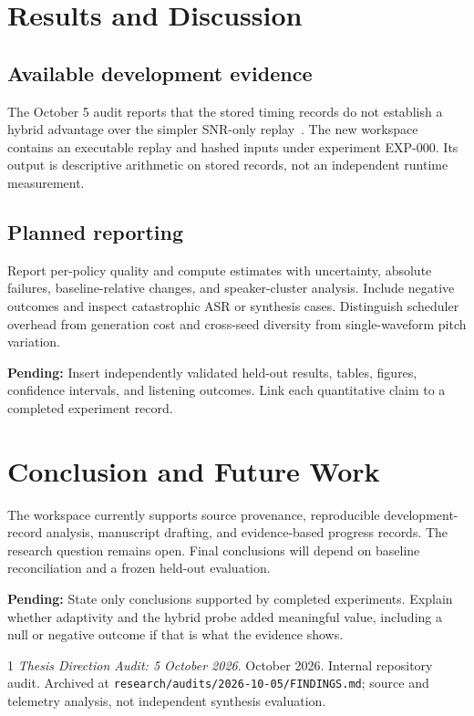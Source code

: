 \documentclass[12pt,a4paper,oneside]{report}
\newcommand{\pending}[1]{\par\noindent\textbf{Pending:} #1\par}
\begin{document}
\chapter{Results and Discussion}
\label{ch:results}
\section{Available development evidence}
The October 5 audit reports that the stored timing records do not establish a hybrid advantage over the simpler SNR-only replay~\cite{internal-audit-2026}. The new workspace contains an executable replay and hashed inputs under experiment EXP-000. Its output is descriptive arithmetic on stored records, not an independent runtime measurement.

\section{Planned reporting}
Report per-policy quality and compute estimates with uncertainty, absolute failures, baseline-relative changes, and speaker-cluster analysis. Include negative outcomes and inspect catastrophic ASR or synthesis cases. Distinguish scheduler overhead from generation cost and cross-seed diversity from single-waveform pitch variation.
\pending{Insert independently validated held-out results, tables, figures, confidence intervals, and listening outcomes. Link each quantitative claim to a completed experiment record.}
\chapter{Conclusion and Future Work}
The workspace currently supports source provenance, reproducible development-record analysis, manuscript drafting, and evidence-based progress records. The research question remains open. Final conclusions will depend on baseline reconciliation and a frozen held-out evaluation.
\pending{State only conclusions supported by completed experiments. Explain whether adaptivity and the hybrid probe added meaningful value, including a null or negative outcome if that is what the evidence shows.}
\begin{thebibliography}{1}
\emph{Thesis Direction Audit: 5 October 2026}. October 2026.
Internal repository audit. Archived at
\texttt{research/audits/2026-10-05/FINDINGS.md}; source and telemetry analysis,
not independent synthesis evaluation.
\end{thebibliography}
\appendix
\end{document}

